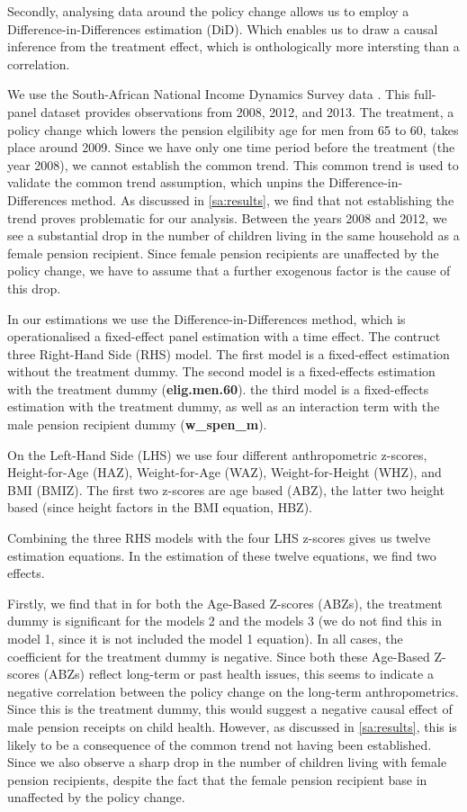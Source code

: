 \begin{refsection}
Secondly, analysing data around the policy change allows us to employ a Difference-in-Differences estimation (DiD).
Which enables us to draw a causal inference from the treatment effect,
which is onthologically more intersting than a correlation.

We use the South-African National Income Dynamics Survey data
\parencite[in collaboration with The World Bank]{saldru2008nids,saldru2012nids,saldru2013nids}.
This full-panel dataset provides observations from 2008, 2012, and 2013.
The treatment, a policy change which lowers the pension elgilibity age for men from 65 to 60, takes place around 2009.
Since we have only one time period before the treatment (the year 2008), we cannot establish the common trend.
This common trend is used to validate the common trend assumption, which unpins the Difference-in-Differences method.
As discussed in \autoref{sa:results}, we find that not establishing the trend proves problematic for our analysis.
Between the years 2008 and 2012,
we see a substantial drop in the number of children living in the same household as a female pension recipient.
Since female pension recipients are unaffected by the policy change, we have to assume that a further exogenous factor is the cause of this drop.

In our estimations we use the Difference-in-Differences method,
which is operationalised a fixed-effect panel estimation with a time effect.
The contruct three Right-Hand Side (RHS) model.
The first model is a fixed-effect estimation without the treatment dummy.
The second model is a fixed-effects estimation with the treatment dummy (\textbf{elig.men.60}).
the third model is a fixed-effects estimation with the treatment dummy,
as well as an interaction term with the male pension recipient dummy (\textbf{w\_spen\_m}).

On the Left-Hand Side (LHS) we use four different anthropometric z-scores,
Height-for-Age (HAZ), Weight-for-Age (WAZ), Weight-for-Height (WHZ), and BMI (BMIZ).
The first two z-scores are age based (ABZ), the latter two height based (since height factors in the BMI equation, HBZ).

Combining the three RHS models with the four LHS z-scores gives us twelve estimation equations.
In the estimation of these twelve equations, we find two effects.

Firstly, we find that in for both the Age-Based Z-scores (ABZs),
the treatment dummy is significant for the models 2 and the models 3
(we do not find this in model 1, since it is not included the model 1 equation).
In all cases, the coefficient for the treatment dummy is negative.
Since both these Age-Based Z-scores (ABZs) reflect long-term or past health issues,
this seems to indicate a negative correlation between the policy change on the long-term anthropometrics.
Since this is the treatment dummy, this would suggest a negative causal effect of male pension receipts on child health.
However, as discussed in \autoref{sa:results},
this is likely to be a consequence of the common trend not having been established.
Since we also observe a sharp drop in the number of children living with female pension recipients,
despite the fact that the female pension recipient base in unaffected by the policy change.


\end{refsection}

